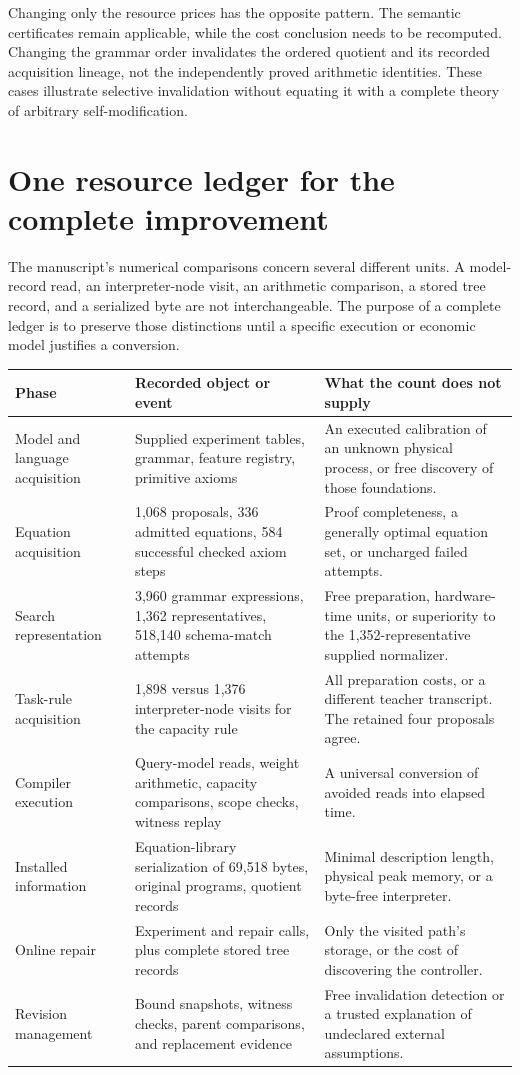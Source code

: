 Changing only the resource prices has the opposite pattern. The semantic certificates remain applicable, while the cost conclusion needs to be recomputed. Changing the grammar order invalidates the ordered quotient and its recorded acquisition lineage, not the independently proved arithmetic identities. These cases illustrate selective invalidation without equating it with a complete theory of arbitrary self-modification.

\section{One resource ledger for the complete improvement}\label{SII:sec:integrated-ledger}
The manuscript's numerical comparisons concern several different units. A model-record read, an interpreter-node visit, an arithmetic comparison, a stored tree record, and a serialized byte are not interchangeable. The purpose of a complete ledger is to preserve those distinctions until a specific execution or economic model justifies a conversion.

\begin{small}\begin{longtable}{@{}P{.25\textwidth}P{.34\textwidth}P{.33\textwidth}@{}}\toprule
Phase & Recorded object or event & What the count does not supply\\\midrule\endhead
Model and language acquisition & Supplied experiment tables, grammar, feature registry, primitive axioms & An executed calibration of an unknown physical process, or free discovery of those foundations.\\
Equation acquisition & 1,068 proposals, 336 admitted equations, 584 successful checked axiom steps & Proof completeness, a generally optimal equation set, or uncharged failed attempts.\\
Search representation & 3,960 grammar expressions, 1,362 representatives, 518,140 schema-match attempts & Free preparation, hardware-time units, or superiority to the 1,352-representative supplied normalizer.\\
Task-rule acquisition & 1,898 versus 1,376 interpreter-node visits for the capacity rule & All preparation costs, or a different teacher transcript. The retained four proposals agree.\\
Compiler execution & Query-model reads, weight arithmetic, capacity comparisons, scope checks, witness replay & A universal conversion of avoided reads into elapsed time.\\
Installed information & Equation-library serialization of 69,518 bytes, original programs, quotient records & Minimal description length, physical peak memory, or a byte-free interpreter.\\
Online repair & Experiment and repair calls, plus complete stored tree records & Only the visited path's storage, or the cost of discovering the controller.\\
Revision management & Bound snapshots, witness checks, parent comparisons, and replacement evidence & Free invalidation detection or a trusted explanation of undeclared external assumptions.\\\bottomrule
\end{longtable}\end{small}

